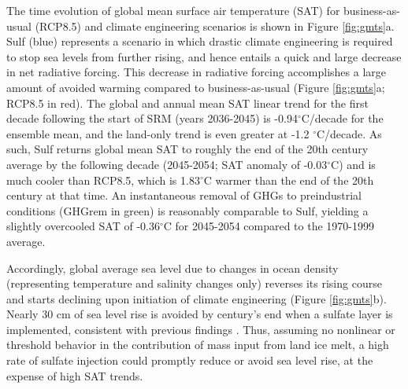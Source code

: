 \documentclass{nature}
\begin{document}
The time evolution of global mean surface air temperature (SAT) for business-as-usual (RCP8.5) and climate engineering scenarios is shown in Figure \ref{fig:gmts}a. Sulf (blue) represents a scenario in which drastic climate engineering is required to stop sea levels from further rising, and hence entails a quick and large decrease in net radiative forcing. This decrease in radiative forcing accomplishes a large amount of avoided warming compared to business-as-usual (Figure \ref{fig:gmts}a; RCP8.5 in red). The global and annual mean SAT linear trend for the first decade following the start of SRM (years 2036-2045) is -0.94$^\circ$C/decade for the ensemble mean, and the land-only trend is even greater at -1.2 $^\circ$C/decade. As such, Sulf returns global mean SAT to roughly the end of the 20th century average by the following decade (2045-2054; SAT anomaly of -0.03$^\circ$C) and is much cooler than RCP8.5, which is 1.83$^\circ$C warmer than the end of the 20th century at that time. An instantaneous removal of GHGs to preindustrial conditions (GHGrem in green) is reasonably comparable to Sulf, yielding a slightly overcooled SAT of -0.36$^\circ$C for 2045-2054 compared to the 1970-1999 average. %

Accordingly, global average sea level due to changes in ocean density (representing temperature and salinity changes only) reverses its rising course and starts declining upon initiation of climate engineering (Figure \ref{fig:gmts}b). Nearly 30 cm of sea level rise is avoided by century's end when a sulfate layer is implemented, consistent with previous findings \cite{irvine12}. Thus, assuming no nonlinear or threshold behavior in the contribution of mass input from land ice melt, a high rate of sulfate injection could promptly reduce or avoid sea level rise, at the expense of high SAT trends. %
\end{document}
